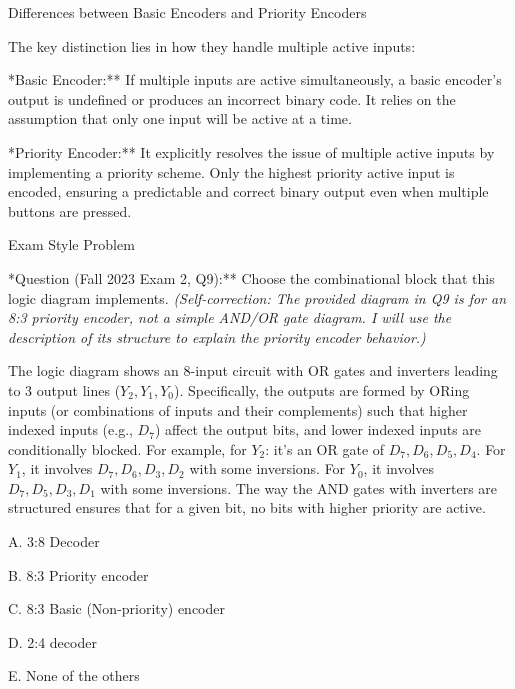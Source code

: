 \documentclass{article}
\begin{document}
Differences between Basic Encoders and Priority Encoders

The key distinction lies in how they handle multiple active inputs:

\item **Basic Encoder:** If multiple inputs are active simultaneously, a basic encoder's output is undefined or produces an incorrect binary code. It relies on the assumption that only one input will be active at a time.

\item **Priority Encoder:** It explicitly resolves the issue of multiple active inputs by implementing a priority scheme. Only the highest priority active input is encoded, ensuring a predictable and correct binary output even when multiple buttons are pressed.

Exam Style Problem

\item **Question (Fall 2023 Exam 2, Q9):** Choose the combinational block that this logic diagram implements.  \textit{(Self-correction: The provided diagram in Q9 is for an 8:3 priority encoder, not a simple AND/OR gate diagram. I will use the description of its structure to explain the priority encoder behavior.)}

\item The logic diagram shows an 8-input circuit with OR gates and inverters leading to 3 output lines ($Y_2, Y_1, Y_0$). Specifically, the outputs are formed by ORing inputs (or combinations of inputs and their complements) such that higher indexed inputs (e.g., $D_7$) affect the output bits, and lower indexed inputs are conditionally blocked. For example, for $Y_2$: it's an OR gate of $D_7, D_6, D_5, D_4$. For $Y_1$, it involves $D_7, D_6, D_3, D_2$ with some inversions. For $Y_0$, it involves $D_7, D_5, D_3, D_1$ with some inversions. The way the AND gates with inverters are structured ensures that for a given bit, no bits with higher priority are active.

    \item A. 3:8 Decoder

    \item B. 8:3 Priority encoder

    \item C. 8:3 Basic (Non-priority) encoder

    \item D. 2:4 decoder

    \item E. None of the others
\end{document}

